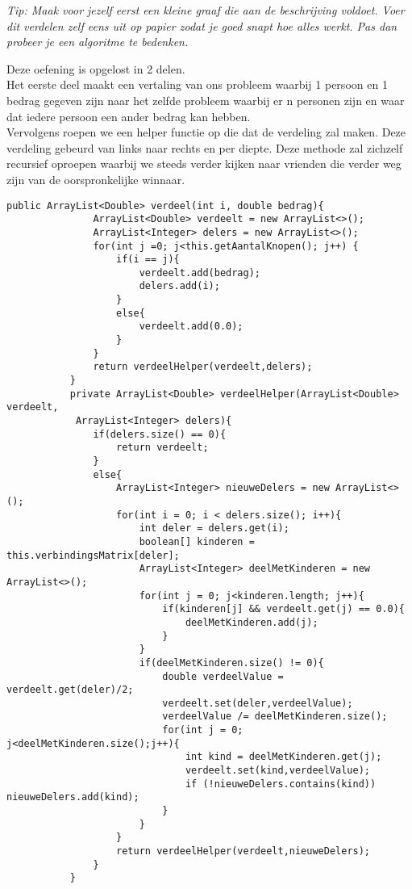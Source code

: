 \begin{oef}
\emph{Tip: Maak voor jezelf eerst een kleine graaf die aan de beschrijving voldoet. Voer dit verdelen zelf eens uit op papier zodat je goed snapt hoe alles werkt. Pas dan probeer je een algoritme te bedenken.}
\begin{opl}
Deze oefening is opgelost in 2 delen. \\ Het eerste deel maakt een vertaling van ons probleem waarbij 1 persoon en 1 bedrag gegeven zijn naar het zelfde probleem waarbij er n personen zijn en waar dat iedere persoon een ander bedrag kan hebben.\\
Vervolgens roepen we een helper functie op die dat de verdeling zal maken. Deze verdeling gebeurd van links naar rechts en per diepte. Deze methode zal zichzelf recursief oproepen waarbij we steeds verder kijken naar vrienden die verder weg zijn van de oorspronkelijke winnaar.
     \begin{lstlisting}[caption={verdeel(i, bedrag) methode}, label=bstaddnode]
          public ArrayList<Double> verdeel(int i, double bedrag){
               ArrayList<Double> verdeelt = new ArrayList<>();
               ArrayList<Integer> delers = new ArrayList<>();
               for(int j =0; j<this.getAantalKnopen(); j++) {
                   if(i == j){
                       verdeelt.add(bedrag);
                       delers.add(i);
                   }
                   else{
                       verdeelt.add(0.0);
                   }
               }
               return verdeelHelper(verdeelt,delers);
           }
           private ArrayList<Double> verdeelHelper(ArrayList<Double> verdeelt,
            ArrayList<Integer> delers){
               if(delers.size() == 0){
                   return verdeelt;
               }
               else{
                   ArrayList<Integer> nieuweDelers = new ArrayList<>();
                   for(int i = 0; i < delers.size(); i++){
                       int deler = delers.get(i);
                       boolean[] kinderen = this.verbindingsMatrix[deler];
                       ArrayList<Integer> deelMetKinderen = new ArrayList<>();
                       for(int j = 0; j<kinderen.length; j++){
                           if(kinderen[j] && verdeelt.get(j) == 0.0){
                               deelMetKinderen.add(j);
                           }
                       }
                       if(deelMetKinderen.size() != 0){
                           double verdeelValue = verdeelt.get(deler)/2;
                           verdeelt.set(deler,verdeelValue);
                           verdeelValue /= deelMetKinderen.size();
                           for(int j = 0; j<deelMetKinderen.size();j++){
                               int kind = deelMetKinderen.get(j);
                               verdeelt.set(kind,verdeelValue);
                               if (!nieuweDelers.contains(kind)) nieuweDelers.add(kind);
                           }
                       }
                   }
                   return verdeelHelper(verdeelt,nieuweDelers);
               }
           }
          \end{lstlisting}
\end{opl}
\end{oef}



